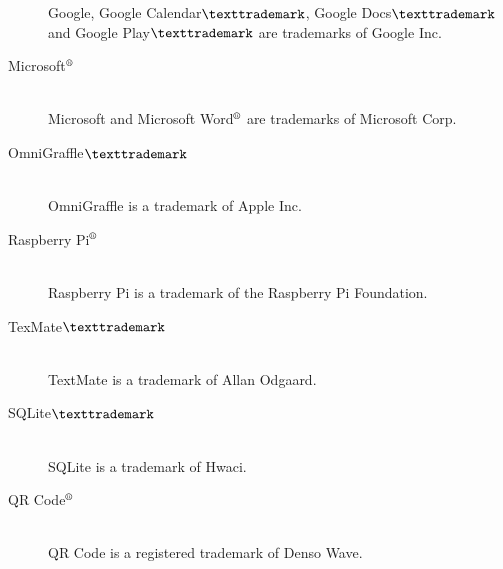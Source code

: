 \begin{description}
		Google, Google Calendar$\texttrademark$, Google Docs$\texttrademark$ and Google Play$\texttrademark$ are trademarks of Google Inc.
	\item[Microsoft$\textsuperscript{\textregistered}$]\hfill \\
		 Microsoft and Microsoft Word$\textsuperscript{\textregistered}$ are trademarks of Microsoft Corp.
	\item[OmniGraffle$\texttrademark$]\hfill \\
		OmniGraffle is a trademark of Apple Inc.
	\item[Raspberry Pi$\textsuperscript{\textregistered}$]\hfill \\
		Raspberry Pi is a trademark of the Raspberry Pi Foundation.
	\item[TexMate$\texttrademark$]\hfill \\
		TextMate is a trademark of Allan Odgaard.
	\item[SQLite$\texttrademark$]\hfill \\
		SQLite is a trademark of Hwaci.
	\item[QR Code$\textsuperscript{\textregistered}$]\hfill \\
		QR Code is a registered trademark of Denso Wave.
\end{description}
